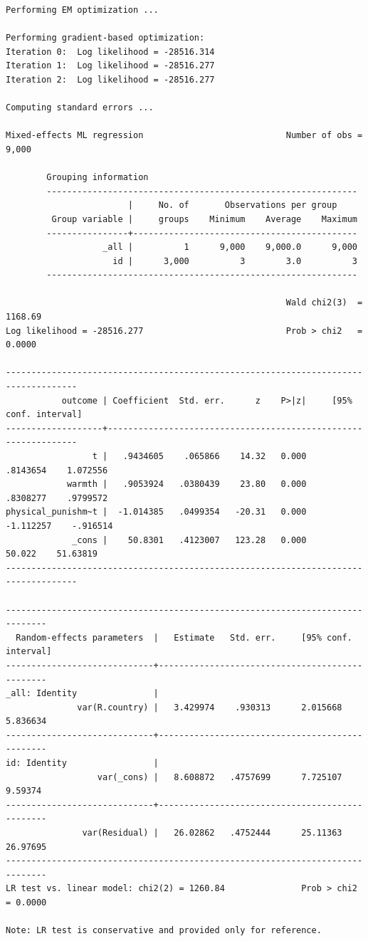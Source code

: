 \documentclass[
  letterpaper,
  DIV=11,
  numbers=noendperiod]{scrreprt}
\begin{document}
\begin{verbatim}
Performing EM optimization ...

Performing gradient-based optimization: 
Iteration 0:  Log likelihood = -28516.314  
Iteration 1:  Log likelihood = -28516.277  
Iteration 2:  Log likelihood = -28516.277  

Computing standard errors ...

Mixed-effects ML regression                            Number of obs =   9,000

        Grouping information
        -------------------------------------------------------------
                        |     No. of       Observations per group
         Group variable |     groups    Minimum    Average    Maximum
        ----------------+--------------------------------------------
                   _all |          1      9,000    9,000.0      9,000
                     id |      3,000          3        3.0          3
        -------------------------------------------------------------

                                                       Wald chi2(3)  = 1168.69
Log likelihood = -28516.277                            Prob > chi2   =  0.0000

------------------------------------------------------------------------------------
           outcome | Coefficient  Std. err.      z    P>|z|     [95% conf. interval]
-------------------+----------------------------------------------------------------
                 t |   .9434605    .065866    14.32   0.000     .8143654    1.072556
            warmth |   .9053924   .0380439    23.80   0.000     .8308277    .9799572
physical_punishm~t |  -1.014385   .0499354   -20.31   0.000    -1.112257    -.916514
             _cons |    50.8301   .4123007   123.28   0.000       50.022    51.63819
------------------------------------------------------------------------------------

------------------------------------------------------------------------------
  Random-effects parameters  |   Estimate   Std. err.     [95% conf. interval]
-----------------------------+------------------------------------------------
_all: Identity               |
              var(R.country) |   3.429974    .930313      2.015668    5.836634
-----------------------------+------------------------------------------------
id: Identity                 |
                  var(_cons) |   8.608872   .4757699      7.725107     9.59374
-----------------------------+------------------------------------------------
               var(Residual) |   26.02862   .4752444      25.11363    26.97695
------------------------------------------------------------------------------
LR test vs. linear model: chi2(2) = 1260.84               Prob > chi2 = 0.0000

Note: LR test is conservative and provided only for reference.
\end{verbatim}
\end{document}
